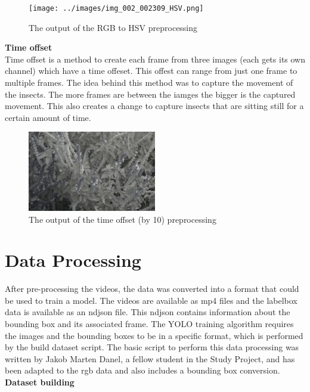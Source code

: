 \begin{figure}[htbp]
    \centering
    \texttt{[image: ../images/img\_002\_002309\_HSV.png]}
    \caption{The output of the RGB to HSV preprocessing}
\end{figure}

\textbf{Time offset} \\
Time offset is a method to create each frame from three images (each gets its own channel) which have a time offeset. This offest can range from just one frame to multiple frames. The idea behind this method was to capture the movement of the insects. The more frames are between the iamges the bigger is the captured movement. This also creates a change to capture insects that are sitting still for a certain amount of time.\\

\begin{figure}[htbp]
    \centering
    \includegraphics[width=0.5\textwidth]{../images/img_002_002309_OffsetBy10.png}
    \caption{The output of the time offset (by 10) preprocessing}
\end{figure}

\section{Data Processing}

After pre-processing the videos, the data was converted into a format that could be used to train a model. The videos are available as mp4 files and the labelbox data is available as an ndjson file. This ndjson contains information about the bounding box and its associated frame. The YOLO training algorithm requires the images and the bounding boxes to be in a specific format, which is performed by the build dataset script. The basic script to perform this data processing was written by Jakob Marten Danel, a fellow student in the Study Project, and has been adapted to the rgb data and also includes a bounding box conversion. \\

\textbf{Dataset building}

